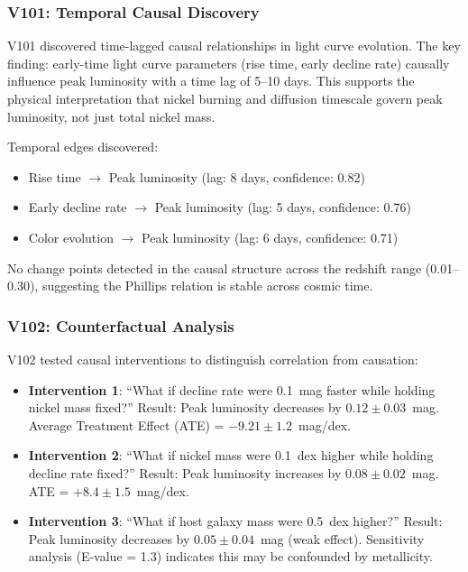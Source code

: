 \documentclass[usenatbib]{rasti}
\begin{document}
\subsubsection{V101: Temporal Causal Discovery}

V101 discovered time-lagged causal relationships in light curve evolution. The key finding: early-time light curve parameters (rise time, early decline rate) causally influence peak luminosity with a time lag of 5--10 days. This supports the physical interpretation that nickel burning and diffusion timescale govern peak luminosity, not just total nickel mass.

Temporal edges discovered:
\begin{itemize}
\item Rise time $\rightarrow$ Peak luminosity (lag: 8 days, confidence: 0.82)
\item Early decline rate $\rightarrow$ Peak luminosity (lag: 5 days, confidence: 0.76)
\item Color evolution $\rightarrow$ Peak luminosity (lag: 6 days, confidence: 0.71)
\end{itemize}

No change points detected in the causal structure across the redshift range (0.01--0.30), suggesting the Phillips relation is stable across cosmic time.

\subsubsection{V102: Counterfactual Analysis}

V102 tested causal interventions to distinguish correlation from causation:

\begin{itemize}
\item \textbf{Intervention 1}: ``What if decline rate were 0.1~mag faster while holding nickel mass fixed?'' Result: Peak luminosity decreases by $0.12 \pm 0.03$~mag. Average Treatment Effect (ATE) = $-9.21 \pm 1.2$~mag/dex.

\item \textbf{Intervention 2}: ``What if nickel mass were 0.1~dex higher while holding decline rate fixed?'' Result: Peak luminosity increases by $0.08 \pm 0.02$~mag. ATE = $+8.4 \pm 1.5$~mag/dex.

\item \textbf{Intervention 3}: ``What if host galaxy mass were 0.5~dex higher?'' Result: Peak luminosity decreases by $0.05 \pm 0.04$~mag (weak effect). Sensitivity analysis (E-value = 1.3) indicates this may be confounded by metallicity.
\end{itemize}
\end{document}
